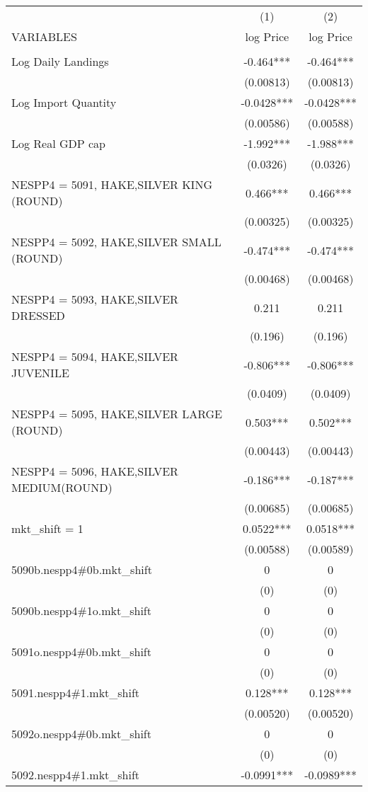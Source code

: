 \begin{tabular}{lcc} \hline
 & (1) & (2) \\
VARIABLES & log Price & log Price \\ \hline
 &  &  \\
Log Daily Landings & -0.464*** & -0.464*** \\
 & (0.00813) & (0.00813) \\
Log Import Quantity & -0.0428*** & -0.0428*** \\
 & (0.00586) & (0.00588) \\
Log Real GDP cap & -1.992*** & -1.988*** \\
 & (0.0326) & (0.0326) \\
NESPP4 = 5091, HAKE,SILVER KING (ROUND) & 0.466*** & 0.466*** \\
 & (0.00325) & (0.00325) \\
NESPP4 = 5092, HAKE,SILVER SMALL (ROUND) & -0.474*** & -0.474*** \\
 & (0.00468) & (0.00468) \\
NESPP4 = 5093, HAKE,SILVER DRESSED & 0.211 & 0.211 \\
 & (0.196) & (0.196) \\
NESPP4 = 5094, HAKE,SILVER JUVENILE & -0.806*** & -0.806*** \\
 & (0.0409) & (0.0409) \\
NESPP4 = 5095, HAKE,SILVER LARGE (ROUND) & 0.503*** & 0.502*** \\
 & (0.00443) & (0.00443) \\
NESPP4 = 5096, HAKE,SILVER MEDIUM(ROUND) & -0.186*** & -0.187*** \\
 & (0.00685) & (0.00685) \\
mkt\_shift = 1 & 0.0522*** & 0.0518*** \\
 & (0.00588) & (0.00589) \\
5090b.nespp4\#0b.mkt\_shift & 0 & 0 \\
 & (0) & (0) \\
5090b.nespp4\#1o.mkt\_shift & 0 & 0 \\
 & (0) & (0) \\
5091o.nespp4\#0b.mkt\_shift & 0 & 0 \\
 & (0) & (0) \\
5091.nespp4\#1.mkt\_shift & 0.128*** & 0.128*** \\
 & (0.00520) & (0.00520) \\
5092o.nespp4\#0b.mkt\_shift & 0 & 0 \\
 & (0) & (0) \\
5092.nespp4\#1.mkt\_shift & -0.0991*** & -0.0989*** \\

\end{tabular}
